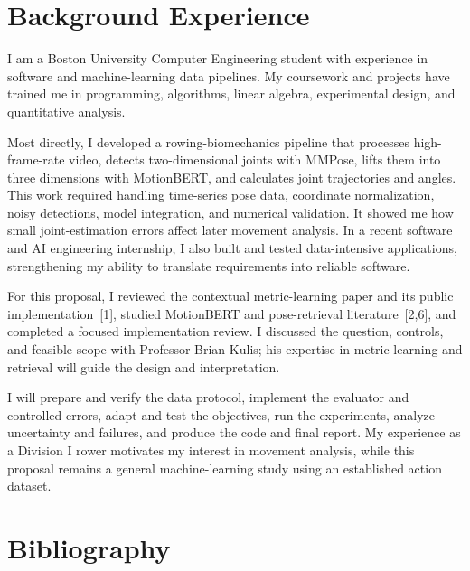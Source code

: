 \documentclass[10pt]{article}
\begin{document}
\newpage
\section*{Background Experience}

I am a Boston University Computer Engineering student with experience in software and machine-learning data pipelines. My coursework and projects have trained me in programming, algorithms, linear algebra, experimental design, and quantitative analysis.

Most directly, I developed a rowing-biomechanics pipeline that processes high-frame-rate video, detects two-dimensional joints with MMPose, lifts them into three dimensions with MotionBERT, and calculates joint trajectories and angles. This work required handling time-series pose data, coordinate normalization, noisy detections, model integration, and numerical validation. It showed me how small joint-estimation errors affect later movement analysis. In a recent software and AI engineering internship, I also built and tested data-intensive applications, strengthening my ability to translate requirements into reliable software.

For this proposal, I reviewed the contextual metric-learning paper and its public implementation~[1], studied MotionBERT and pose-retrieval literature~[2,6], and completed a focused implementation review. I discussed the question, controls, and feasible scope with Professor Brian Kulis; his expertise in metric learning and retrieval will guide the design and interpretation.

I will prepare and verify the data protocol, implement the evaluator and controlled errors, adapt and test the objectives, run the experiments, analyze uncertainty and failures, and produce the code and final report. My experience as a Division I rower motivates my interest in movement analysis, while this proposal remains a general machine-learning study using an established action dataset.

\section*{Bibliography}
\end{document}
